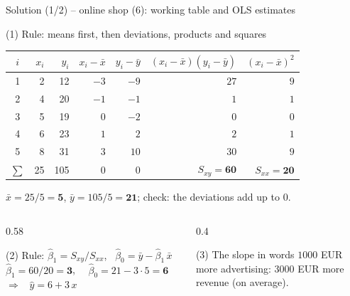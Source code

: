 \documentclass[aspectratio=169,11pt]{beamer}
\begin{document}
\begin{frame}{Solution (1/2) -- online shop (6): working table and OLS estimates}
  \begin{block}{(1) Rule: means first, then deviations, products and squares}
    \vspace{-4pt}
    \begin{center}
      \footnotesize
      \renewcommand{\arraystretch}{0.95}
      \begin{tabular}{crrrrrr}
        \toprule
        $i$ & $x_i$ & $y_i$ & $x_i - \bar{x}$ & $y_i - \bar{y}$ & $(x_i - \bar{x})(y_i - \bar{y})$ & $(x_i - \bar{x})^{2}$ \\
        \midrule
        1 & 2 & 12 & $-3$ & $-9$ & $27$ & $9$ \\
        2 & 4 & 20 & $-1$ & $-1$ & $1$  & $1$ \\
        3 & 5 & 19 & $0$  & $-2$ & $0$  & $0$ \\
        4 & 6 & 23 & $1$  & $2$  & $2$  & $1$ \\
        5 & 8 & 31 & $3$  & $10$ & $30$ & $9$ \\
        \midrule
        $\sum$ & 25 & 105 & $0$ & $0$ & $S_{xy} = \mathbf{60}$ & $S_{xx} = \mathbf{20}$ \\
        \bottomrule
      \end{tabular}
    \end{center}
    \small $\bar{x} = 25/5 = \mathbf{5}$, \quad $\bar{y} = 105/5 = \mathbf{21}$; \quad
    check: the deviations add up to $0$.
  \end{block}
  \vspace{-4pt}

  \begin{columns}[T]
    \begin{column}{0.58\textwidth}
      \begin{block}{(2) Rule: $\hat{\beta}_1 = S_{xy}/S_{xx}$, \ $\hat{\beta}_0 = \bar{y} - \hat{\beta}_1\,\bar{x}$}
        $\hat{\beta}_1 = 60/20 = \mathbf{3}$, \ \ $\hat{\beta}_0 = 21 - 3 \cdot 5 = \mathbf{6}$
        \ $\Rightarrow$ \ $\hat{y} = 6 + 3\,x$
      \end{block}
    \end{column}
    \begin{column}{0.4\textwidth}
      \begin{exampleblock}{(3) The slope in words}
        $1000$ EUR more advertising: $3000$ EUR more revenue (on average).
      \end{exampleblock}
    \end{column}
  \end{columns}
\end{frame}
\end{document}
